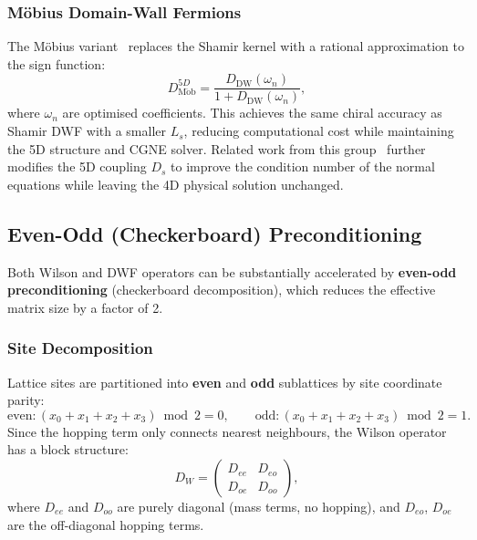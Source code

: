 \documentclass[12pt,a4paper]{article}
\begin{document}
\subsubsection{M\"{o}bius Domain-Wall Fermions}

The M\"{o}bius variant~\cite{Brower2012} replaces the Shamir kernel
with a rational approximation to the sign function:
\begin{equation}
  D_{\mathrm{M\ddot{o}b}}^{5D} = \frac{D_{\mathrm{DW}}(\omega_n)}{1+D_{\mathrm{DW}}(\omega_n)},
\end{equation}
where $\omega_n$ are optimised coefficients.
This achieves the same chiral accuracy as Shamir DWF with a smaller $L_s$,
reducing computational cost while maintaining the 5D structure and CGNE solver.
Related work from this group~\cite{Chen2026} further modifies the 5D coupling
$D_s$ to improve the condition number of the normal equations while leaving the
4D physical solution unchanged.

\subsection{Even-Odd (Checkerboard) Preconditioning}
\label{sec:evenodd}

Both Wilson and DWF operators can be substantially accelerated by
\textbf{even-odd preconditioning} (checkerboard decomposition), which
reduces the effective matrix size by a factor of 2.

\subsubsection{Site Decomposition}

Lattice sites are partitioned into \textbf{even} and \textbf{odd} sublattices
by site coordinate parity:
\begin{equation}
  \text{even}: (x_0+x_1+x_2+x_3) \bmod 2 = 0, \qquad
  \text{odd}:  (x_0+x_1+x_2+x_3) \bmod 2 = 1.
\end{equation}
Since the hopping term only connects nearest neighbours, the Wilson
operator has a block structure:
\begin{equation}
  D_W =
  \begin{pmatrix}
    D_{ee} & D_{eo} \\
    D_{oe} & D_{oo}
  \end{pmatrix},
  \label{eq:block_D}
\end{equation}
where $D_{ee}$ and $D_{oo}$ are purely diagonal (mass terms, no hopping),
and $D_{eo}$, $D_{oe}$ are the off-diagonal hopping terms.
\end{document}
